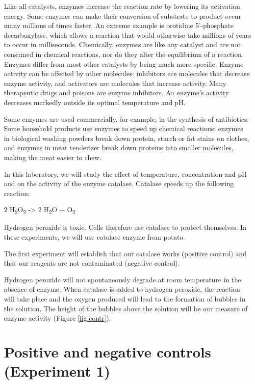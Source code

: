 \documentclass[]{book}
\begin{document}
Like all catalysts, enzymes increase the reaction rate by lowering its activation energy. Some enzymes can make their conversion of substrate to product occur many millions of times faster. An extreme example is orotidine 5'-phosphate decarboxylase, which allows a reaction that would otherwise take millions of years to occur in milliseconds. Chemically, enzymes are like any catalyst and are not consumed in chemical reactions, nor do they alter the equilibrium of a reaction. Enzymes differ from most other catalysts by being much more specific. Enzyme activity can be affected by other molecules: inhibitors are molecules that decrease enzyme activity, and activators are molecules that increase activity. Many therapeutic drugs and poisons are enzyme inhibitors. An enzyme's activity decreases markedly outside its optimal temperature and pH.

Some enzymes are used commercially, for example, in the synthesis of antibiotics. Some household products use enzymes to speed up chemical reactions: enzymes in biological washing powders break down protein, starch or fat stains on clothes, and enzymes in meat tenderizer break down proteins into smaller molecules, making the meat easier to chew.

In this laboratory, we will study the effect of temperature, concentration and pH and on the activity of the enzyme catalase. Catalase speeds up the following reaction:

2 H\textsubscript{2}O\textsubscript{2} -\textgreater{} 2 H\textsubscript{2}O + O\textsubscript{2}

Hydrogen peroxide is toxic. Cells therefore use catalase to protect themselves. In these experiments, we will use catalase enzyme from potato.

The first experiment will establish that our catalase works (positive control) and that our reagents are not contaminated (negative control).

Hydrogen peroxide will not spontaneously degrade at room temperature in the absence of enzyme. When catalase is added to hydrogen peroxide, the reaction will take place and the oxygen produced will lead to the formation of bubbles in the solution. The height of the bubbles above the solution will be our measure of enzyme activity (Figure \ref{fig:contr}).

\hypertarget{positive-and-negative-controls-experiment-1}{%
\section{Positive and negative controls (Experiment 1)}\label{positive-and-negative-controls-experiment-1}}
\end{document}
